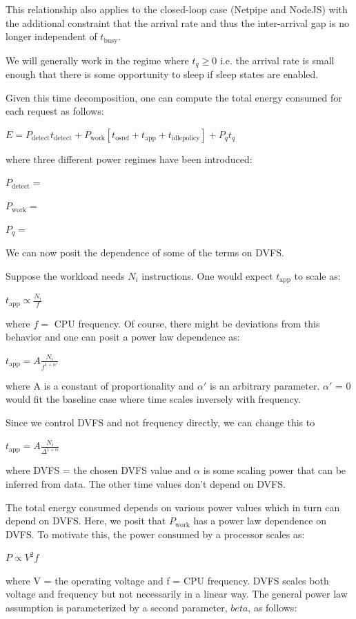 This relationship also applies to the closed-loop case (Netpipe and NodeJS) with the additional constraint that the arrival rate and thus the inter-arrival gap is no longer independent of $t_\text{busy}$.

We will generally work in the regime where $t_q \geq 0$ i.e. the arrival rate is small enough that there is some opportunity to sleep if sleep states are enabled.

Given this time decomposition, one can compute the total energy consumed for each request as follows:

$E = P_\text{detect} t_{\text{detect}} + P_{\text{work}} \left[t_{\text{osref}} + t_{\text{app}} + t_{\text{idlepolicy}}\right] + P_q t_q$

where three different power regimes have been introduced:

$P_\text{detect} = $

$P_\text{work} = $

$P_q = $

We can now posit the dependence of some of the terms on DVFS.

Suppose the workload needs $N_i$ instructions. One would expect $t_\text{app}$ to scale as:

$t_{\text{app}} \propto \frac{N_i}{f}$

where $f = $ CPU frequency. Of course, there might be deviations from this behavior and one can posit a power law dependence as:

$t_{\text{app}} = A\frac{N_i}{f^{1+\alpha'}}$

where A is a constant of proportionality and $\alpha'$ is an arbitrary parameter. $\alpha'$ = 0 would fit the baseline case where time scales inversely with frequency.

Since we control DVFS and not frequency directly, we can change this to

$t_{\text{app}} = A\frac{N_i}{\Delta^{1+\alpha}}$

where DVFS = the chosen DVFS value and $\alpha$ is some scaling power that can be inferred from data. The other time values don't depend on DVFS.

The total energy consumed depends on various power values which in turn can depend on DVFS. Here, we posit that $P_{\text{work}}$ has a power law dependence on DVFS. To motivate this, the power consumed by a processor scales as:

$P \propto V^2 f$

where V = the operating voltage and f = CPU frequency. DVFS scales both voltage and frequency but not necessarily in a linear way. The general power law assumption is parameterized by a second parameter, $beta$, as follows:

